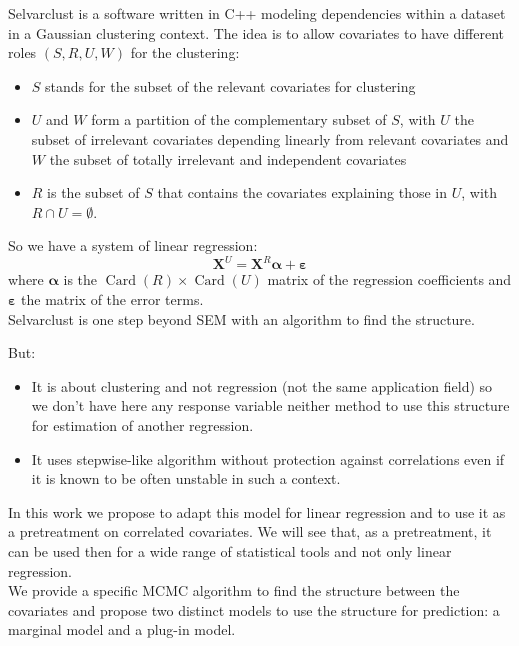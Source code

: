 \documentclass[12pt,a4paper]{report}
\begin{document}
			Selvarclust is a software written in C++ modeling dependencies within a dataset			 \cite{maugis2009variable} in a Gaussian clustering context.
			The idea is to allow covariates to have different roles $(S,R,U,W)$ for the clustering:
			\begin{itemize}
				\item $S$ stands for the subset of the relevant covariates for clustering
				\item $U$ and $W$ form a partition of the complementary subset of $S$, with $U$ the subset of irrelevant covariates depending linearly from relevant covariates and $W$ the subset of totally irrelevant and independent covariates
				\item $R$ is the subset of $S$ that contains the covariates explaining those in $U$, with $R\cap U=\emptyset$.
\end{itemize}			 
So we have a system of linear regression:
\begin{equation}
	\boldsymbol{X}^{U}=\boldsymbol{X}^R \boldsymbol{\alpha}+ \boldsymbol{\varepsilon}
\end{equation}
where $\boldsymbol{\alpha}$ is the $\operatorname{Card}(R)\times \operatorname{Card}(U)$ matrix of the regression coefficients and $\boldsymbol{\varepsilon}$ the matrix of the error terms.\\
Selvarclust is one step beyond SEM with an algorithm to find the structure.		

			But:
			\begin{itemize}
				\item It is about clustering and not regression (not the same application field) so we don't have here any response variable neither method to use this structure for estimation of another regression. 
				\item It uses stepwise-like algorithm without protection against correlations \cite{raftery2006variable} even if it is known to be often unstable \cite{miller2002subset} in such a context.
			\end{itemize}
			
			In this work we propose to adapt this model for linear regression and to use it as a pretreatment on correlated covariates. We will see that, as a pretreatment, it can be used then for a wide range of statistical tools and not only linear regression.\\
			We provide a specific MCMC algorithm to find the structure between the covariates and propose two distinct models to use the structure for prediction: a marginal model and a plug-in model.	\\
			
\end{document}
